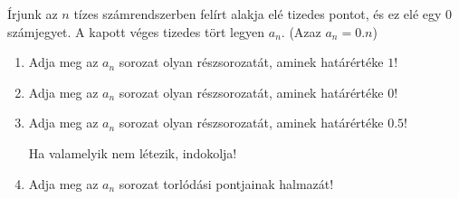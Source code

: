 \documentclass[11pt]{scrartcl}
\begin{document}
Írjunk az $n$ tízes számrendszerben felírt alakja elé tizedes pontot, és ez
elé egy $0$ számjegyet. A kapott véges tizedes tört legyen $a_n$. (Azaz
$a_n = 0.n$)
\begin{enumerate}
	\item Adja meg az $a_n$ sorozat olyan részsorozatát, aminek határértéke
	      $1$!

	\item Adja meg az $a_n$ sorozat olyan részsorozatát, aminek határértéke
	      $0$!

	\item Adja meg az $a_n$ sorozat olyan részsorozatát, aminek határértéke
	      $0.5$!

	      Ha valamelyik nem létezik, indokolja!

	\item Adja meg az $a_n$ sorozat torlódási pontjainak halmazát!
\end{enumerate}
\end{document}
